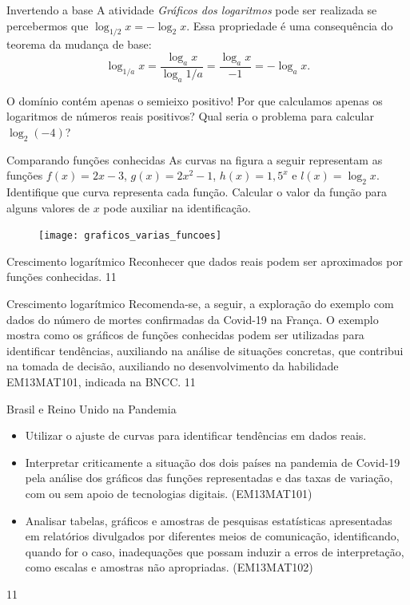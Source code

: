 \begin{observation}{Invertendo a base}
A atividade \textit{Gráficos dos logaritmos} pode ser realizada se percebermos que $\log_{1/2} x = -\log_{2} x$. Essa propriedade é uma consequência do teorema da mudança de base:
$$
\log_{1/a} x = \frac{\log_a x}{\log_a {1/a}} = \frac{\log_a x}{-1} = -\log_a x. 
$$
\end{observation}


\begin{reflection}{O domínio contém apenas o semieixo positivo!}
Por que calculamos apenas os logaritmos de números reais positivos? Qual seria o problema para calcular $\log_2 (-4)$?
\end{reflection}


\begin{task}{Comparando funções conhecidas}
As curvas na figura a seguir representam as funções $f(x) = 2x-3$, $g(x)=2x^2-1$, $h(x)=1{,}5^x$ e $l(x)=\log_2 x$. Identifique que curva representa cada função. Calcular o valor da função para alguns valores de $x$ pode auxiliar na identificação.

\begin{figure}[H]
\centering

\texttt{[image: graficos\_varias\_funcoes]}
\end{figure}

\end{task}

\clearpage
\begin{objectives}{Crescimento logarítmico}
{
	Reconhecer que dados reais podem ser aproximados por funções conhecidas.
}{1}{1}
\end{objectives}
\begin{sugestions}{Crescimento logarítmico}
{
	Recomenda-se, a seguir, a exploração do exemplo com dados do número de mortes confirmadas da Covid-19 na França. O exemplo mostra como os gráficos de funções conhecidas podem ser utilizadas para identificar tendências, auxiliando na análise de situações concretas, que contribui na tomada de decisão, auxiliando no desenvolvimento da habilidade EM13MAT101, indicada na BNCC.
}{1}{1}
\end{sugestions}

\begin{objectives}{Brasil e Reino Unido na Pandemia}
{
	\begin{itemize}
	\item Utilizar o ajuste de curvas para identificar tendências em dados reais.
	\item Interpretar criticamente a situação dos dois países na pandemia de Covid-19 pela análise dos gráficos das funções representadas e das taxas de variação, com ou sem apoio de tecnologias digitais. (EM13MAT101)
	\item Analisar tabelas, gráficos e amostras de pesquisas estatísticas apresentadas em relatórios divulgados por diferentes meios de comunicação, identificando, quando for o caso, inadequações que possam induzir a erros de interpretação, como escalas e amostras não apropriadas. (EM13MAT102)
	\end{itemize}
}{1}{1}
\end{objectives}

